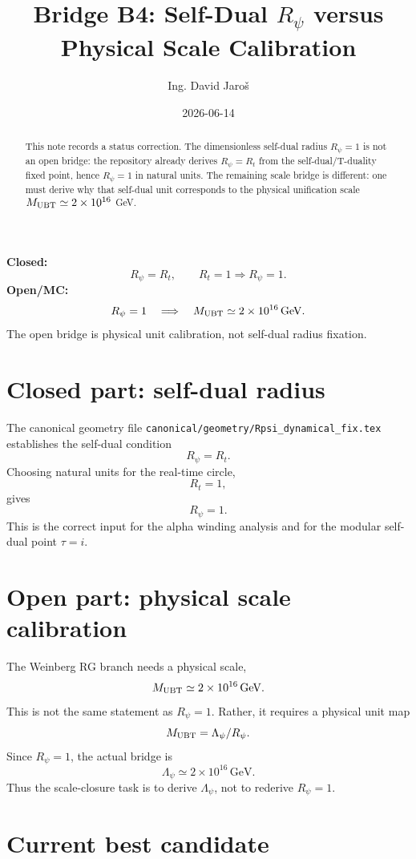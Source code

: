\documentclass[12pt,a4paper]{article}
\title{Bridge B4: Self-Dual $R_\psi$ versus Physical Scale Calibration}
\author{Ing. David Jaroš}
\date{2026-06-14}
\begin{document}
\maketitle

\begin{abstract}
This note records a status correction.  The dimensionless self-dual radius
$R_\psi=1$ is not an open bridge: the repository already derives
$R_\psi=R_t$ from the self-dual/T-duality fixed point, hence $R_\psi=1$ in
natural units.  The remaining scale bridge is different: one must derive why
that self-dual unit corresponds to the physical unification scale
$M_{\rm UBT}\simeq2\times10^{16}$ GeV.
\end{abstract}

\begin{statusbox}
\textbf{Closed:}
\[
  R_\psi=R_t,
  \qquad R_t=1\Rightarrow R_\psi=1.
\]
\textbf{Open/MC:}
\[
  R_\psi=1
  \quad\Longrightarrow\quad
  M_{\rm UBT}\simeq2\times10^{16}\,\mathrm{GeV}.
\]
The open bridge is physical unit calibration, not self-dual radius fixation.
\end{statusbox}

\section{Closed part: self-dual radius}

The canonical geometry file
\texttt{canonical/geometry/Rpsi\_dynamical\_fix.tex} establishes the self-dual
condition
\[
  R_\psi = R_t.
\]
Choosing natural units for the real-time circle,
\[
  R_t=1,
\]
gives
\[
  \boxed{R_\psi=1}.
\]
This is the correct input for the alpha winding analysis and for the modular
self-dual point $\tau=i$.

\section{Open part: physical scale calibration}

The Weinberg RG branch needs a physical scale,
\[
  M_{\rm UBT}\simeq2\times10^{16}\,\mathrm{GeV}.
\]
This is not the same statement as $R_\psi=1$.  Rather, it requires a physical
unit map
\[
  M_{\rm UBT}=\Lambda_\psi/R_\psi.
\]
Since $R_\psi=1$, the actual bridge is
\[
  \Lambda_\psi\simeq2\times10^{16}\,\mathrm{GeV}.
\]
Thus the scale-closure task is to derive $\Lambda_\psi$, not to rederive
$R_\psi=1$.

\section{Current best candidate}
\end{document}
